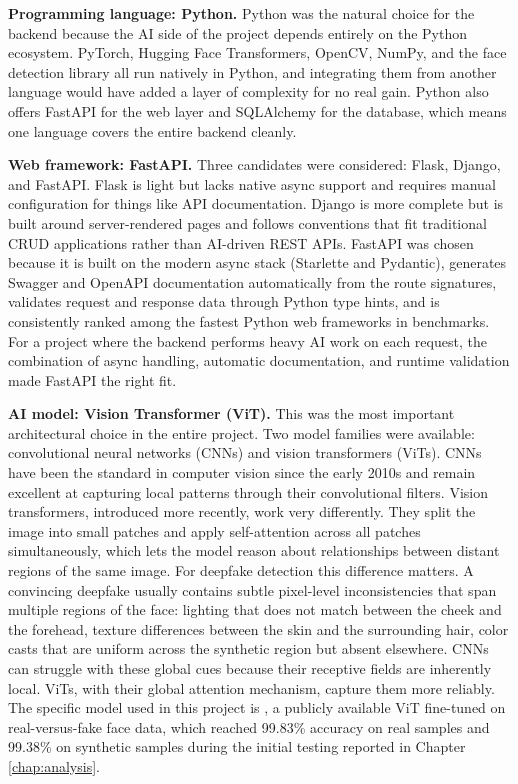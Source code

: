\noindent\textbf{Programming language: Python.} Python was the natural choice for the backend because the AI side of the project depends entirely on the Python ecosystem. PyTorch, Hugging Face Transformers, OpenCV, NumPy, and the face detection library all run natively in Python, and integrating them from another language would have added a layer of complexity for no real gain. Python also offers FastAPI for the web layer and SQLAlchemy for the database, which means one language covers the entire backend cleanly.

\noindent\textbf{Web framework: FastAPI.} Three candidates were considered: Flask, Django, and FastAPI. Flask is light but lacks native async support and requires manual configuration for things like API documentation. Django is more complete but is built around server-rendered pages and follows conventions that fit traditional CRUD applications rather than AI-driven REST APIs. FastAPI was chosen because it is built on the modern async stack (Starlette and Pydantic), generates Swagger and OpenAPI documentation automatically from the route signatures, validates request and response data through Python type hints, and is consistently ranked among the fastest Python web frameworks in benchmarks. For a project where the backend performs heavy AI work on each request, the combination of async handling, automatic documentation, and runtime validation made FastAPI the right fit.

\noindent\textbf{AI model: Vision Transformer (ViT).} This was the most important architectural choice in the entire project. Two model families were available: convolutional neural networks (CNNs) and vision transformers (ViTs). CNNs have been the standard in computer vision since the early 2010s and remain excellent at capturing local patterns through their convolutional filters. Vision transformers, introduced more recently, work very differently. They split the image into small patches and apply self-attention across all patches simultaneously, which lets the model reason about relationships between distant regions of the same image. For deepfake detection this difference matters. A convincing deepfake usually contains subtle pixel-level inconsistencies that span multiple regions of the face: lighting that does not match between the cheek and the forehead, texture differences between the skin and the surrounding hair, color casts that are uniform across the synthetic region but absent elsewhere. CNNs can struggle with these global cues because their receptive fields are inherently local. ViTs, with their global attention mechanism, capture them more reliably. The specific model used in this project is , a publicly available ViT fine-tuned on real-versus-fake face data, which reached 99.83\% accuracy on real samples and 99.38\% on synthetic samples during the initial testing reported in Chapter \ref{chap:analysis}.

